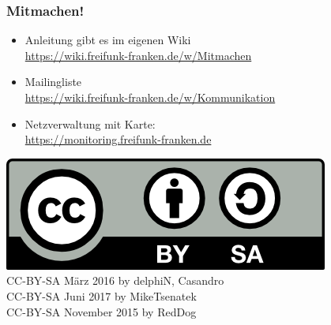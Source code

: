 \begin{frame}
\frametitle{Mitmachen!}
	\begin{itemize}
		\item Anleitung gibt es im eigenen Wiki 
			\\ \href{https://wiki.freifunk-franken.de/w/Mitmachen}{https://wiki.freifunk-franken.de/w/Mitmachen}
		\item Mailingliste 
			\\ \href{https://wiki.freifunk-franken.de/w/Kommunikation}{https://wiki.freifunk-franken.de/w/Kommunikation}
		\item Netzverwaltung mit Karte: 
			\\ \href{https://monitoring.freifunk-franken.de}{https://monitoring.freifunk-franken.de}
	\end{itemize}
	\begin{flushright}
		\includegraphics[scale=0.7]{images/CC-BY-SA.png}
		\begingroup \tiny{		
			\\CC-BY-SA März 2016 by delphiN, Casandro
			\\CC-BY-SA Juni 2017 by MikeTsenatek
			\\CC-BY-SA November 2015 by RedDog}
		\endgroup
	\end{flushright}
\end{frame}
